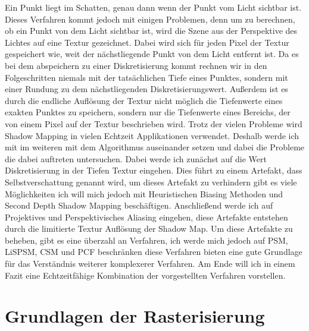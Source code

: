 Ein Punkt liegt im Schatten, genau dann wenn der Punkt vom Licht sichtbar ist.
Dieses Verfahren kommt jedoch mit einigen Problemen, denn um zu berechnen, ob ein Punkt von dem Licht sichtbar ist,
wird die Szene aus der Perspektive des Lichtes auf eine Textur gezeichnet.
Dabei wird sich für jeden Pixel der Textur gespeichert wie, weit der nächstliegende Punkt von dem Licht entfernt ist.
Da es bei dem abspeichern zu einer Diskretisierung kommt rechnen 
wir in den Folgeschritten niemals mit der tatsächlichen Tiefe eines Punktes,
sondern mit einer Rundung zu dem nächstliegenden Diskretisierungswert.
Außerdem ist es durch die endliche Auflösung der Textur nicht möglich die Tiefenwerte eines exakten Punktes zu speichern,
sondern nur die Tiefenwerte eines Bereichs, der von einem Pixel auf der Textur beschrieben wird.
\newline
\newline
Trotz der vielen Probleme wird Shadow Mapping in vielen Echtzeit Applikationen verwendet.
Deshalb werde ich mit im weiteren mit dem Algorithmus auseinander setzen und dabei die Probleme die dabei auftreten untersuchen.
Dabei werde ich zunächst auf die Wert Diskretisierung in der Tiefen Textur eingehen.
Dies führt zu einem Artefakt, dass Selbstverschattung genannt wird, um dieses Artefakt zu verhindern gibt es 
viele Möglichkeiten ich will mich jedoch mit Heuristischen Biasing Methoden und Second Depth Shadow Mapping beschäftigen.
Anschließend werde ich auf Projektives und Perspektivisches Aliasing eingehen, diese Artefakte entstehen durch 
die limitierte Textur Auflösung der Shadow Map.
Um diese Artefakte zu beheben, gibt es eine überzahl an Verfahren, ich werde mich jedoch auf PSM, LiSPSM, CSM und PCF beschränken 
diese Verfahren bieten eine gute Grundlage für das Verständnis weiterer komplexerer Verfahren.
Am Ende will ich in einem Fazit eine Echtzeitfähige Kombination der vorgestellten Verfahren vorstellen.



\chapter{Grundlagen der Rasterisierung}
